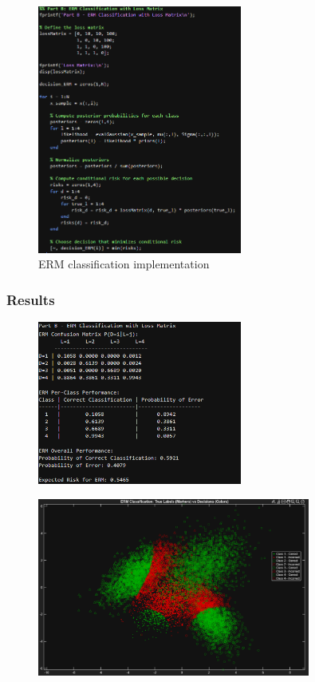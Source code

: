 \documentclass[12pt]{article}
\begin{document}
\begin{figure}[H]
    \centering
    \includegraphics[width=0.6\textwidth]{q2_erm_code.png}
    \caption{ERM classification implementation}
\end{figure}

\subsubsection{Results}

\begin{figure}[H]
    \centering
    \includegraphics[width=0.6\textwidth]{q2_erm_output.png}
\end{figure}

\begin{figure}[H]
    \centering
    \includegraphics[width=0.8\textwidth]{erm_classification.png}
\end{figure}
\end{document}
